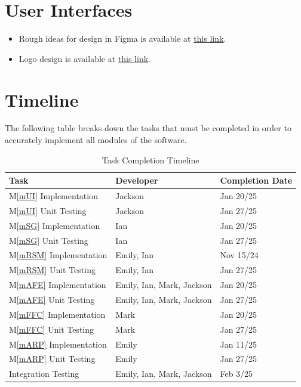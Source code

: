 \documentclass[12pt, titlepage]{article}
\newcommand{\mref}[1]{M\ref{#1}}
\begin{document}
\section{User Interfaces} \label{SecUI}
\begin{itemize}
  \item Rough ideas for design in Figma is available at \href{https://www.figma.com/design/CWFjGlXuaUj9XEe1k2O9HN/ScoreGen?node-id=8-16&t=teQzB6fJFKylFmIW-1}{this link}.
  \item Logo design is available at \href{https://www.canva.com/design/DAGb84uW3qQ/pLjQfILAEV3cagekQF9ojQ/edit?utm_content=DAGb84uW3qQ&utm_campaign=designshare&utm_medium=link2&utm_source=sharebutton}{this link}.
\end{itemize}

\section{Timeline} \label{SecTL}
The following table breaks down the tasks that must be completed in order to 
accurately implement all modules of the software.

\begin{table}[H]
  \centering
  \begin{tabular}{p{} p{} p{}}
  \toprule
  \textbf{Task} & \textbf{Developer} & \textbf{Completion Date}\\
  \midrule
  \mref{mUI} Implementation & Jackson & Jan 20/25\\
  \mref{mUI} Unit Testing & Jackson & Jan 27/25\\
  \mref{mSG} Implementation & Ian & Jan 20/25\\
  \mref{mSG} Unit Testing & Ian & Jan 27/25\\
  \mref{mRSM} Implementation & Emily, Ian & Nov 15/24\\
  \mref{mRSM} Unit Testing & Emily, Ian & Jan 27/25\\
  \mref{mAFE} Implementation & Emily, Ian, Mark, Jackson & Jan 20/25\\
  \mref{mAFE} Unit Testing & Emily, Ian, Mark, Jackson & Jan 27/25\\
  \mref{mFFC} Implementation & Mark & Jan 20/25\\
  \mref{mFFC} Unit Testing & Mark & Jan 27/25\\
  \mref{mARP} Implementation & Emily & Jan 11/25\\
  \mref{mARP} Unit Testing & Emily & Jan 27/25\\
  Integration Testing & Emily, Ian, Mark, Jackson & Feb 3/25\\
  \bottomrule
  \end{tabular}
  \caption{Task Completion Timeline}
  \label{TblSched}
  \end{table}
\end{document}
